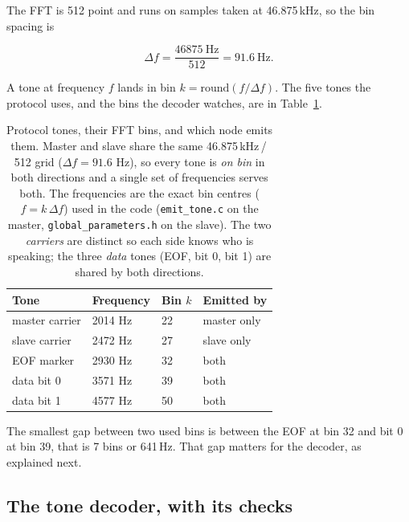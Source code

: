 \documentclass[a4paper,11pt]{article}
\begin{document}
The FFT is 512 point and runs on samples taken at 46.875\,kHz, so the bin spacing
is

\[
\Delta f = \frac{46875\ \mathrm{Hz}}{512} = 91.6\ \mathrm{Hz}.
\]

A tone at frequency $f$ lands in bin $k = \mathrm{round}(f / \Delta f)$. The five
tones the protocol uses, and the bins the decoder watches, are in
Table~\ref{tab:bins}.

\begin{table}[H]
\centering
\caption{Protocol tones, their FFT bins, and which node emits them. Master and slave
share the same 46.875\,kHz\,/\,512 grid ($\Delta f = 91.6$ Hz), so every tone is
\emph{on bin} in both directions and a single set of frequencies serves both. The
frequencies are the exact bin centres ($f = k\,\Delta f$) used in the code
(\texttt{emit\_tone.c} on the master, \texttt{global\_parameters.h} on the slave).
The two \emph{carriers} are distinct so each side knows who is speaking; the three
\emph{data} tones (EOF, bit 0, bit 1) are shared by both directions.}
\label{tab:bins}
\begin{tabular}{llll}
\toprule
\textbf{Tone} & \textbf{Frequency} & \textbf{Bin $k$} & \textbf{Emitted by} \\
\midrule
master carrier & 2014 Hz & 22 & master only \\
slave carrier  & 2472 Hz & 27 & slave only \\
EOF marker     & 2930 Hz & 32 & both \\
data bit 0     & 3571 Hz & 39 & both \\
data bit 1     & 4577 Hz & 50 & both \\
\bottomrule
\end{tabular}
\end{table}

The smallest gap between two used bins is between the EOF at bin 32 and bit 0 at
bin 39, that is 7 bins or 641\,Hz. That gap matters for the decoder, as explained
next.

\subsection{The tone decoder, with its checks}
\end{document}
